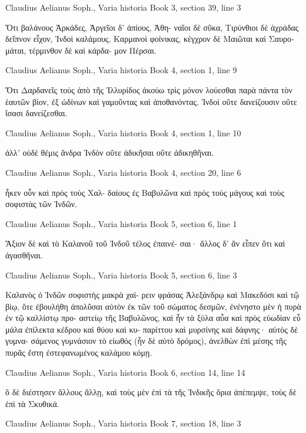 \documentclass[12pt,letterpaper,twoside,final]{memoir}
\begin{document}
\begin{greek}
Claudius Aelianus Soph., Varia historia 
Book 3, section 39, line 3

Ὅτι βαλάνους Ἀρκάδες, Ἀργεῖοι δ' ἀπίους, Ἀθη-
ναῖοι δὲ σῦκα, Τιρύνθιοι δὲ ἀχράδας δεῖπνον εἶχον, 
Ἰνδοὶ καλάμους, Καρμανοὶ φοίνικας, κέγχρον δὲ 
Μαιῶται καὶ Σαυρομάται, τέρμινθον δὲ καὶ κάρδα-
μον Πέρσαι. 



Claudius Aelianus Soph., Varia historia 
Book 4, section 1, line 9

Ὅτι Δαρδανεῖς τοὺς ἀπὸ τῆς Ἰλλυρίδος ἀκούω 
τρὶς μόνον λούεσθαι παρὰ πάντα τὸν ἑαυτῶν βίον, 
ἐξ ὠδίνων καὶ γαμοῦντας καὶ ἀποθανόντας. 
 Ἰνδοὶ οὔτε δανείζουσιν οὔτε ἴσασι δανείζεσθαι. 



Claudius Aelianus Soph., Varia historia 
Book 4, section 1, line 10

ἀλλ' οὐδὲ θέμις ἄνδρα Ἰνδὸν οὔτε ἀδικῆσαι οὔτε 
ἀδικηθῆναι. 



Claudius Aelianus Soph., Varia historia 
Book 4, section 20, line 6

                       ἧκεν οὖν καὶ πρὸς τοὺς Χαλ-
δαίους ἐς Βαβυλῶνα καὶ πρὸς τοὺς μάγους καὶ τοὺς 
σοφιστὰς τῶν Ἰνδῶν. 



Claudius Aelianus Soph., Varia historia 
Book 5, section 6, line 1

Ἄξιον δὲ καὶ τὸ Καλανοῦ τοῦ Ἰνδοῦ τέλος ἐπαινέ-
σαι· ἄλλος δ' ἂν εἶπεν ὅτι καὶ ἀγασθῆναι. 



Claudius Aelianus Soph., Varia historia 
Book 5, section 6, line 3

               Καλανὸς ὁ Ἰνδῶν σοφιστὴς μακρὰ χαί-
ρειν φράσας Ἀλεξάνδρῳ καὶ Μακεδόσι καὶ τῷ βίῳ, 
ὅτε ἐβουλήθη ἀπολῦσαι αὑτὸν ἐκ τῶν τοῦ σώματος 
δεσμῶν, ἐνένηστο μὲν ἡ πυρὰ ἐν τῷ καλλίστῳ προ-
αστείῳ τῆς Βαβυλῶνος, καὶ ἦν τὰ ξύλα αὖα καὶ πρὸς 
εὐωδίαν εὖ μάλα ἐπίλεκτα κέδρου καὶ θύου καὶ κυ-
παρίττου καὶ μυρσίνης καὶ δάφνης· αὐτὸς δὲ γυμνα-
σάμενος γυμνάσιον τὸ εἰωθός (ἦν δὲ αὐτὸ δρόμος), 
ἀνελθὼν ἐπὶ μέσης τῆς πυρᾶς ἔστη ἐστεφανωμένος 
καλάμου κόμῃ. 



Claudius Aelianus Soph., Varia historia 
Book 6, section 14, line 14

                          ὃ δὲ διέστησεν ἄλλους ἄλλῃ, 
καὶ τοὺς μὲν ἐπὶ τὰ τῆς Ἰνδικῆς ὅρια ἀπέπεμψε, τοὺς 
δὲ ἐπὶ τὰ Σκυθικά. 



Claudius Aelianus Soph., Varia historia 
Book 7, section 18, line 3


\end{greek}
\end{document}
